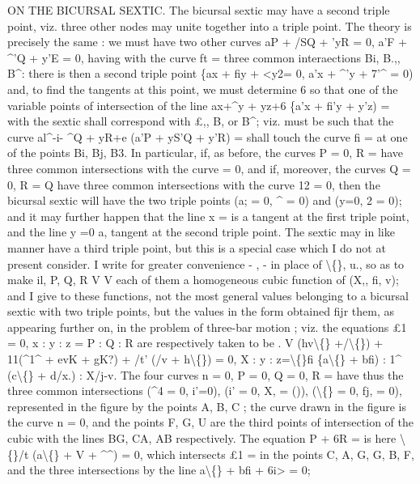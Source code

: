 \documentclass[12pt,a4paper]{article}
\begin{document}
ON THE BICURSAL
SEXTIC.
The
bicursal
sextic may
have
a
second
triple
point,
viz.
three
other
nodes may
unite
together
into
a
triple
point.
The
theory
is
precisely
the
same
: we
must
have
two
other
curves aP + /SQ + 'yR = 0,
a'F + \textasciicircum{}'Q + y'E = 0,
having
with
the
curve
ft =
three common interaections Bi,
B.,, B\textasciicircum{}:
there
is then a second
triple point
\{ax + fiy + <y2= 0,
a'x + \textasciicircum{}'y + 7'\textasciicircum{} = 0)
and,
to
find
the
tangents
at
this
point,
we
must
determine
6
so
that
one
of
the
variable points of intersection of the
line
ax+\textasciicircum{}y + yz+6 \{a'x + fi'y + y'z) =
with
the
sextic
shall correspond with
\pounds{},, B\guillemotleft{}, or B\textasciicircum{};
viz.
must be such
that the curve
al\textasciicircum{}-i- \textasciicircum{}Q + yR+e (a'P + yS'Q + y'R) =
shall
touch
the curve
fi =
at one
of the
points
Bi,
Bj,
B3.
In
particular,
if,
as
before,
the
curves P = 0, R =
have
three common
intersections
with
the
curve
= 0,
and
if,
moreover,
the
curves
Q = 0, R = Q
have
three common
intersections
with
the
curve
12 = 0,
then
the
bicursal
sextic
will
have
the
two
triple
points
(a; = 0,
\textasciicircum{} = 0)
and (y=0, 2 = 0);
and
it may further happen that
the
line
x =
is
a
tangent
at
the
first
triple
point, and
the
line y =0
a,
tangent
at
the
second
triple
point.
The
sextic may
in
like
manner have a third
triple
point, but
this
is a
special case which
I do not at present
consider.
I
write
for
greater
convenience
-
,
-
in
place
of
\textbackslash\{\},
u.,
so
as
to make
il, P,
Q, R
V
V
each
of them a homogeneous
cubic
function
of
(X,,
fi,
v);
and
I give
to these
functions,
not
the most
general
values
belonging
to
a
bicursal
sextic with two
triple
points, but
the
values
in
the
form
obtained
fijr them,
as
appearing
further
on,
in
the problem of
three-bar motion ;
viz. the
equations
\pounds{}1 = 0, x
: y
: z = P
: Q
: R are
respectively taken
to be
.
V (hv\textbackslash\{\} +/\textbackslash\{\}\guillemotright{}) + 11(\textasciicircum{}1\textasciicircum{} + evK + gK?) + /t' (/v + h\textbackslash\{\}) = 0,
X
: y
: z=\textbackslash\{\}fi \{a\textbackslash\{\} + bfi)
:
1\textasciicircum{} (c\textbackslash\{\} + d/x.)
:
X/j-v.
The four curves n = 0, P = 0, Q = 0, R =
have thus the
three common intersections
(\textasciicircum{}4 = 0, i'=0),
(i' = 0,
X, = ()),
(\textbackslash\{\} = 0,
fj, = 0),
represented
in
the
figure by the points
A,
B, C
;
the curve drawn
in the
figure
is the
curve n = 0, and
the
points
F,
G, U
are
the
third
points
of
intersection
of
the
cubic
with
the
lines BG, CA, AB respectively.
The
equation P + 6R =
is
here
\textbackslash\{\}/t (a\textbackslash\{\} + V + \textasciicircum{}\textasciicircum{}) = 0,
which
intersects
\pounds{}1 =
in
the
points
C, A,
G,
G, B, F,
and
the
three
intersections
by the
line
a\textbackslash\{\} + bfi + 6i> = 0;
\end{document}
